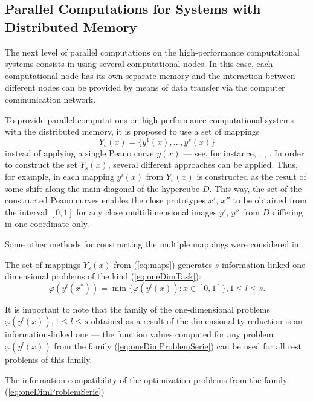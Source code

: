 \documentclass{aims}
\theoremstyle{definition}
\begin{document}
\subsection{Parallel Computations for Systems with Distributed Memory}
\label{subsec:distribpar}
The next level of parallel computations on the high-performance computational systems
consists in using several computational nodes. In this case, each computational node has
its own separate memory and the interaction between different nodes can be provided by
means of data transfer via the computer communication network.
\par
To provide parallel computations on high-performance computational systems with the distributed memory, it is proposed to use a set of mappings
\begin{equation}
  \label{eq:maps}
Y_s(x)=\{y^1(x),\dots,y^s(x)\}
\end{equation}
instead of applying a single Peano curve \(y(x)\) --- see, for instance,
\cite{strongin1992}, \cite{stronginGergelBarkalovParGO}, \cite{strSergGO}.
In order to construct the set \(Y_s(x)\), several different approaches can be applied.
Thus, for example, in \cite{strongin1992} each mapping \(y^i(x)\) from \(Y_s(x)\) is constructed
as the result of some shift along the main diagonal of the hypercube \(D\). This way,
the set of the constructed Peano curves enables the close prototypes \(x'\), \(x''\)
to be obtained from the interval \([0, 1]\) for any close multidimensional images
\(y'\), \(y''\) from \(D\) differing in one coordinate only.
\par
Some other methods for constructing the multiple mappings were considered in \cite{stronginGergelBarkalovParGO}.
\par
The set of mappings \(Y_s(x)\) from (\ref{eq:maps}) generates \(s\) information-linked one-dimensional
problems of the kind (\ref{eq:oneDimTask}):
\begin{equation}
  \label{eq:oneDimProblemSerie}
  \varphi(y^l(x^*))=\min\{\varphi(y^l(x)):x\in [0,1]\},1\leq l\leq s.
\end{equation}
\par
It is important to note that the family of the one-dimensional problems
\(\varphi(y^l(x)),1 \leq l \leq s\) obtained as a result of the dimensionality
reduction is an information-linked one --- the function values computed for any
problem \(\varphi(y^l(x))\) from the family (\ref{eq:oneDimProblemSerie}) can be used for all rest problems of this family.
\par
The information compatibility of the optimization problems from the family (\ref{eq:oneDimProblemSerie})
\end{document}
